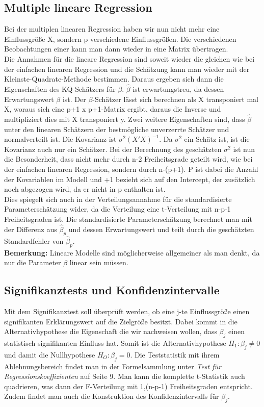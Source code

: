 \documentclass[a4paper]{article}
\begin{document}
\subsection{Multiple lineare Regression}\label{sec:mult-reg}
Bei der multiplen linearen Regression haben wir nun nicht mehr eine Einflussgröße X, sondern p verschiedene Einflussgrößen. Die verschiedenen Beobachtungen einer kann man dann wieder in eine Matrix übertragen.\\
Die Annahmen für die lineare Regression sind soweit wieder die gleichen wie bei der einfachen linearen Regression und die Schätzung kann man wieder mit der Kleinste-Quadrate-Methode bestimmen.
Daraus ergeben sich dann die Eigenschaften des KQ-Schätzers für $\beta$. $\hat\beta$ ist erwartungstreu, da dessen Erwartungswert $\beta$ ist. Der $\beta$-Schätzer lässt sich berechnen als X transponiert mal X, woraus sich eine p+1 x p+1-Matrix ergibt, daraus die Inverse und multipliziert dies mit X transponiert y. Zwei weitere Eigenschaften sind, dass $\hat\beta$ unter den linearen Schätzern der bestmögliche unverzerrte Schätzer und normalverteilt ist. Die Kovarianz ist $\sigma^2(X'X)^{-1}$. Da $\sigma^2$ ein Schätz ist, ist die Kovarianz auch nur ein Schätzer.
Bei der Berechnung des geschätzten $\sigma^2$ ist nun die Besonderheit, dass nicht mehr durch n-2 Freiheitsgrade geteilt wird, wie bei der einfachen linearen Regression, sondern durch n-(p+1). P ist dabei die Anzahl der Kovariablen im Modell und +1 bezieht sich auf den Intercept, der zusätzlich noch abgezogen wird, da er nicht in p enthalten ist. \\
Dies spiegelt sich auch in der Verteilungsannahme für die standardisierte Parameterschätzung wider, da die Verteilung eine t-Verteilung mit n-p-1 Freiheitsgraden ist. Die standardisierte Parameterschätzung berechnet man mit der Differenz aus $\hat\beta_p$ und dessen Erwartungswert und teilt durch die geschätzten Standardfehler von $\hat\beta_p$.\\
\textbf{Bemerkung:} Lineare Modelle sind möglicherweise allgemeiner als man denkt, da nur die Parameter $\beta$ linear sein müssen.

\subsection{Signifikanztests und Konfidenzintervalle}
Mit dem Signifikanztest soll überprüft werden, ob eine j-te Einflussgröße einen signifikanten Erklärungswert auf die Zielgröße besitzt. Dabei kommt in die Alternativhypothese die Eigenschaft die wir nachweisen wollen, dass $\beta_j$ einen statistisch signifikanten Einfluss hat. Somit ist die Alternativhypothese $H_1:\beta_j\neq0$ und damit die Nullhypothese $H_O:\beta_j=0$. Die Teststatistik mit ihrem Ablehnungsbereich findet man in der Formelsammlung unter \textit{Test für Regressionskoeffizienten} auf Seite 9. Man kann die komplette t-Statistik auch quadrieren, was dann der F-Verteilung mit 1,(n-p-1) Freiheitsgraden entspricht. Zudem findet man auch die Konstruktion des Konfidenzintervalls für $\beta_j$.
\end{document}
